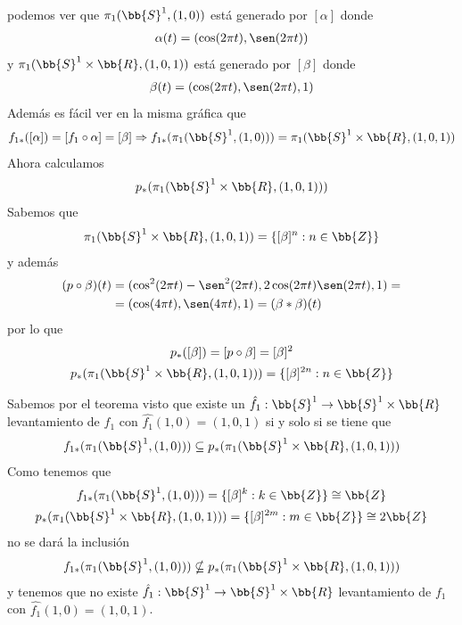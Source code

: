 \begin{ejemplo}
    podemos ver que $\pi_1(\bb{S}^1,(1,0))$ está generado por $[\alpha]$ donde 
    \begin{gather*}
        \alpha(t) = (\cos(2\pi t), \sen(2\pi t))
    \end{gather*}
    y $\pi_1(\bb{S}^1\times \bb{R}, (1,0,1))$ está generado por $[\beta]$ donde 
    \begin{gather*}
        \beta(t) = (\cos(2\pi t), \sen(2\pi t), 1)
    \end{gather*}
    Además es fácil ver en la misma gráfica que
    \begin{gather*}
        f_{1*}([\alpha]) = [f_1 \circ \alpha] = [\beta] \Rightarrow
        f_{1*}(\pi_1(\bb{S}^1, (1,0))) = \pi_1(\bb{S}^1\times \bb{R}, (1,0,1))
    \end{gather*}
    Ahora calculamos
    \begin{gather*}
        p_*(\pi_1(\bb{S}^1 \times \bb{R}, (1,0,1)))
    \end{gather*}
    Sabemos que 
    \begin{gather*}
        \pi_1(\bb{S}^1 \times \bb{R}, (1,0,1)) = \{[\beta]^n : n\in \bb{Z}\}
    \end{gather*}
    y además
    \begin{align*}
        (p\circ \beta)(t) &= (\cos^2(2\pi t) - \sen^2(2\pi t), 2\cos (2\pi t)\sen(2\pi t), 1) =\\
        &= (\cos(4\pi t), \sen(4\pi t), 1) = (\beta \ast \beta)(t)
    \end{align*}
    por lo que 
    \begin{gather*}
        p_*([\beta]) = [p\circ \beta] = [\beta]^2\\
        p_*(\pi_1(\bb{S}^1 \times \bb{R}, (1,0,1))) = \{[\beta]^{2n} : n\in \bb{Z}\}
    \end{gather*}

    Sabemos por el teorema visto que existe un $\hat{f_1} : \bb{S}^1 \to \bb{S}^1 \times \bb{R}$ levantamiento de $f_1$ con $\hat{f_1}(1,0)=(1,0,1)$ si y solo si se tiene que 
    \begin{gather*}
        f_{1*}(\pi_1(\bb{S}^1, (1,0))) \subseteq p_*(\pi_1(\bb{S}^1 \times \bb{R}, (1,0,1)))
    \end{gather*}
    Como tenemos que 
    \begin{gather*}
        f_{1*}(\pi_1(\bb{S}^1, (1,0))) = \{[\beta]^k : k\in \bb{Z}\} \cong \bb{Z} \\
        p_*(\pi_1(\bb{S}^1 \times \bb{R}, (1,0,1))) = \{[\beta]^{2m}: m\in \bb{Z}\} \cong 2\bb{Z}
    \end{gather*}
    no se dará la inclusión 
    \begin{gather*}
        f_{1*}(\pi_1(\bb{S}^1, (1,0))) \nsubseteq p_*(\pi_1(\bb{S}^1 \times \bb{R}, (1,0,1)))
    \end{gather*}
    y tenemos que no existe $\hat{f_1} : \bb{S}^1 \to \bb{S}^1 \times \bb{R}$ levantamiento de $f_1$ con $\hat{f_1}(1,0)=(1,0,1)$.


\end{ejemplo}
